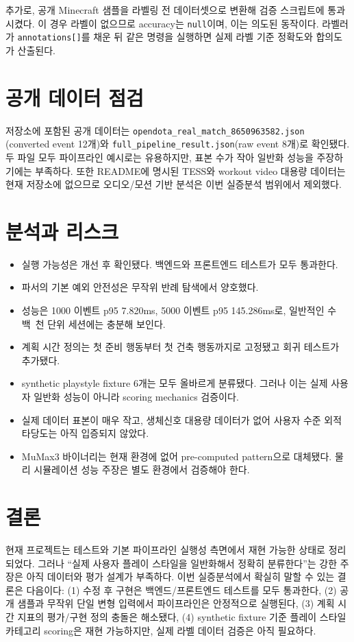 \documentclass[11pt,a4paper]{article}
\begin{document}
추가로, 공개 Minecraft 샘플을 라벨링 전 데이터셋으로 변환해 검증 스크립트에 통과시켰다.
이 경우 라벨이 없으므로 accuracy는 \texttt{null}이며, 이는 의도된 동작이다. 라벨러가
\texttt{annotations[]}를 채운 뒤 같은 명령을 실행하면 실제 라벨 기준 정확도와 합의도가 산출된다.

\section{공개 데이터 점검}
저장소에 포함된 공개 데이터는 \texttt{opendota\_real\_match\_8650963582.json}
(converted event 12개)와 \texttt{full\_pipeline\_result.json}(raw event 8개)로 확인됐다.
두 파일 모두 파이프라인 예시로는 유용하지만, 표본 수가 작아 일반화 성능을 주장하기에는
부족하다. 또한 README에 명시된 TESS와 workout video 대용량 데이터는 현재 저장소에 없으므로
오디오/모션 기반 분석은 이번 실증분석 범위에서 제외했다.

\section{분석과 리스크}
\begin{itemize}
  \item 실행 가능성은 개선 후 확인됐다. 백엔드와 프론트엔드 테스트가 모두 통과한다.
  \item 파서의 기본 예외 안전성은 무작위 반례 탐색에서 양호했다.
  \item 성능은 1000 이벤트 p95 7.820ms, 5000 이벤트 p95 145.286ms로, 일반적인 수백~천 단위 세션에는 충분해 보인다.
  \item 계획 시간 정의는 첫 준비 행동부터 첫 건축 행동까지로 고정됐고 회귀 테스트가 추가됐다.
  \item synthetic playstyle fixture 6개는 모두 올바르게 분류됐다. 그러나 이는 실제 사용자 일반화 성능이 아니라 scoring mechanics 검증이다.
  \item 실제 데이터 표본이 매우 작고, 생체신호 대용량 데이터가 없어 사용자 수준 외적 타당도는 아직 입증되지 않았다.
  \item MuMax3 바이너리는 현재 환경에 없어 pre-computed pattern으로 대체됐다. 물리 시뮬레이션 성능 주장은 별도 환경에서 검증해야 한다.
\end{itemize}

\section{결론}
현재 프로젝트는 테스트와 기본 파이프라인 실행성 측면에서 재현 가능한 상태로 정리되었다.
그러나 ``실제 사용자 플레이 스타일을 일반화해서 정확히 분류한다''는 강한 주장은 아직 데이터와
평가 설계가 부족하다. 이번 실증분석에서 확실히 말할 수 있는 결론은 다음이다:
(1) 수정 후 구현은 백엔드/프론트엔드 테스트를 모두 통과한다,
(2) 공개 샘플과 무작위 단일 변형 입력에서 파이프라인은 안정적으로 실행된다,
(3) 계획 시간 지표의 평가/구현 정의 충돌은 해소됐다,
(4) synthetic fixture 기준 플레이 스타일 카테고리 scoring은 재현 가능하지만, 실제 라벨 데이터 검증은 아직 필요하다.
\end{document}
